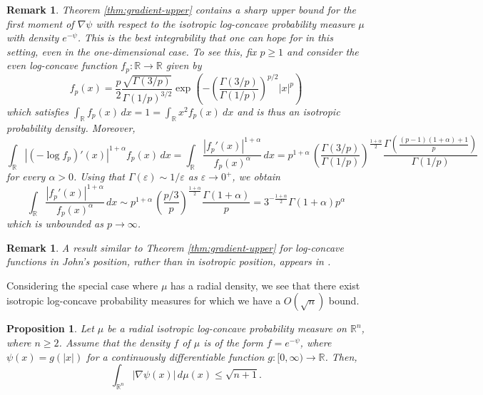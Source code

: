\documentclass[11pt,leqno]{article}
\newtheorem{proposition}[theorem]{Proposition}
\newtheorem{remark}[theorem]{Remark}
\theoremstyle{definition}
\theoremstyle{remark}
\numberwithin{equation}{section}
\newcommand{\ls}{\leqslant}
\newcommand{\gr}{\geqslant}
\newcommand{\1}{\textbf{1}}
\newcommand{\R}{\mathbb{R}}
\newcommand{\e}{\varepsilon}
\def\e{\varepsilon}
\begin{document}
\begin{remark} \rm
Theorem \ref{thm:gradient-upper} contains a sharp upper bound for the first moment of $\nabla \psi$ with respect to the isotropic log-concave probability measure $\mu$ with density $e^{-\psi}$. This is the best integrability that one can hope for in this setting, even in the one-dimensional case. To see this, fix $p\gr 1$ and consider the even log-concave function $f_p:\R\to\R$ given by
$$
f_p(x)
=
\frac{p}{2}
\frac{\sqrt{\Gamma\!\left(3/p\right)}}{\Gamma\!\left(1/p\right)^{3/2}}
\exp\!\left(
-
\left(\frac{\Gamma\!\left(3/p\right)}{\Gamma\!\left(1/p\right)}\right)^{p/2}
|x|^p
\right)
$$
which satisfies $\int_\R f_p(x)\, dx = 1 = \int_\R x^2 f_p(x) \ dx$ and is thus an isotropic probability density. Moreover,
$$
\int_\R |(-\log f_p)'(x)|^{1+\alpha} f_p(x) \, dx = \int_{\mathbb{R}} \frac{|f_p'(x)|^{1+\alpha}}{f_p(x)^\alpha}\,dx
=
p^{1+\alpha} \, \left(\frac{\Gamma(3/p)}{\Gamma(1/p)} \right)^{\frac{1+\alpha}{2}} \frac{\Gamma\left(\frac{(p-1)(1+\alpha)+1}{p}\right)}{\Gamma(1/p)}
$$
for every $\alpha>0$. Using that $\Gamma(\varepsilon) \sim 1/\varepsilon$ as $\e\to0^+$, we obtain
$$\int_{\mathbb{R}} \frac{|f_p'(x)|^{1+\alpha}}{f_p(x)^\alpha}\,dx \sim p^{1+\alpha} \, \left(\frac{p/3}{p} \right)^{\frac{1+\alpha}{2}} \frac{\Gamma(1+\alpha)}{p} = 3^{-\frac{1+\alpha}{2}} \Gamma(1+\alpha) p^\alpha$$
which is unbounded as $p\to\infty$.
\end{remark}

\begin{remark}\rm A result similar to Theorem \ref{thm:gradient-upper} for log-concave functions in John's position, rather than in isotropic position, 
appears in \cite[Remark~3.3]{GK25}.
\end{remark}


Considering the special case where $\mu$ has a radial density, we see that there exist isotropic log-concave probability measures for
which we have a $O(\sqrt{n})$ bound.

\begin{proposition}\label{prop:radial}
Let $\mu$ be a radial isotropic log-concave probability measure on $\mathbb{R}^n$, where $n\gr2$. Assume that the density $f$ of $\mu$ is of the form
$f=e^{-\psi}$, where $\psi(x)=g(|x|)$ for a continuously differentiable function $g:[0,\infty)\to\mathbb{R}$.
Then,
$$\int_{\mathbb{R}^n}|\nabla\psi(x)|\,d\mu(x) \ls \sqrt{n+1}.$$
\end{proposition}
\end{document}
